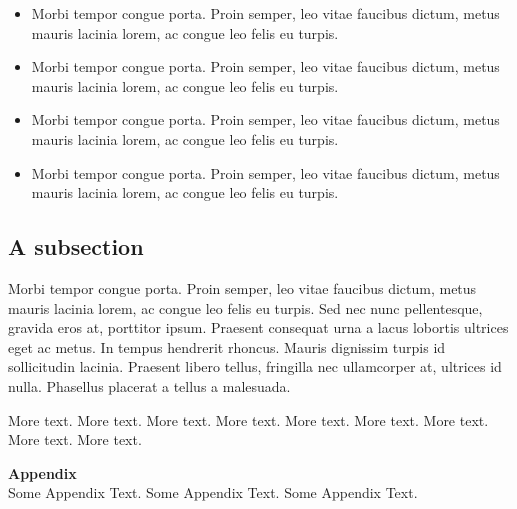 \documentclass[11pt,titlepage,twoside,openright]{report}
\begin{document}
\begin{itemize}
	\item Morbi tempor congue porta. Proin semper, leo vitae faucibus dictum, metus mauris lacinia lorem, ac congue leo felis eu turpis. 
	\item Morbi tempor congue porta. Proin semper, leo vitae faucibus dictum, metus mauris lacinia lorem, ac congue leo felis eu turpis. 
	\item Morbi tempor congue porta. Proin semper, leo vitae faucibus dictum, metus mauris lacinia lorem, ac congue leo felis eu turpis. 
	\item Morbi tempor congue porta. Proin semper, leo vitae faucibus dictum, metus mauris lacinia lorem, ac congue leo felis eu turpis. 
\end{itemize}

\subsection[1st Subsection Name]{A subsection}

Morbi tempor congue porta. Proin semper, leo vitae faucibus dictum, metus mauris lacinia lorem, ac congue leo felis eu turpis. Sed nec nunc pellentesque, gravida eros at, porttitor ipsum. Praesent consequat urna a lacus lobortis ultrices eget ac metus. In tempus hendrerit rhoncus. Mauris dignissim turpis id sollicitudin lacinia. Praesent libero tellus, fringilla nec ullamcorper at, ultrices id nulla. Phasellus placerat a tellus a malesuada.

More text. More text. More text.  More text. More text. More text. More text. More text. More text. 

%
%

\cleardoublepage

\pagestyle{plain}

{\textbf{\LARGE{Appendix}}}\\ %

Some Appendix Text.  Some Appendix Text. Some Appendix Text.


%
%
\end{document}
